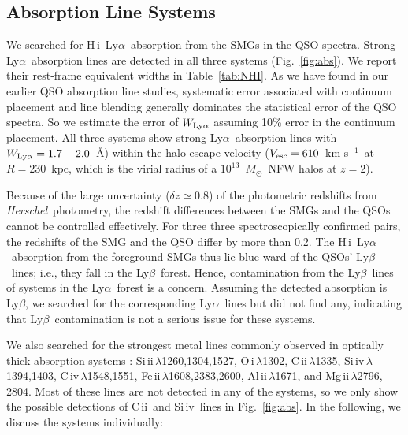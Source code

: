\documentclass[iop,revtex4,twocolumn,apj,numberedappendix,appendixfloats]{emulateapj}
\newcommand{\hers}{{\it Herschel}}
\newcommand{\kms}{{km s$^{-1}$}}
\newcommand{\msun}{$M_{\odot}$}
\newcommand{\lya}{Ly$\alpha$}
\newcommand{\lyb}{Ly$\beta$}
\newcommand{\HI}{H\,{\sc i}}
\newcommand{\CII}{C\,{\sc ii}}
\newcommand{\SiIV}{Si\,{\sc iv}}
\begin{document}
\subsection{Absorption Line Systems}

We searched for \HI\ \lya\ absorption from the SMGs in the QSO spectra. Strong \lya\ absorption lines are detected in all three systems (Fig.~\ref{fig:abs}). We report their rest-frame equivalent widths in Table~\ref{tab:NHI}. As we have found in our earlier QSO absorption line studies, systematic error associated with continuum placement and line blending generally dominates the statistical error of the QSO spectra. So we estimate the error of $W_{\rm Ly\alpha}$ assuming 10\% error in the continuum placement. All three systems show strong \lya\ absorption lines with $W_{\rm Ly\alpha} = 1.7-2.0$~\AA) within the halo escape velocity ($V_{\rm esc} = 610$~\kms\ at $R = 230$~kpc, which is the virial radius of a $10^{13}$~\msun\ NFW halos at $z = 2$).

Because of the large uncertainty ($\delta z \simeq 0.8$) of the photometric redshifts from \hers\ photometry, the redshift differences between the SMGs and the QSOs cannot be controlled effectively. For three three spectroscopically confirmed pairs, the redshifts of the SMG and the QSO differ by more than 0.2. The \HI\ \lya\ absorption from the foreground SMGs thus lie blue-ward of the QSOs' \lyb\ lines; i.e., they fall in the \lyb\ forest. Hence, contamination from the \lyb\ lines of systems in the \lya\ forest is a concern. Assuming the detected absorption is \lyb, we searched for the corresponding \lya\ lines but did not find any, indicating that \lyb\ contamination is not a serious issue for these systems. 

We also searched for the strongest metal lines commonly observed in optically thick absorption systems \citep[e.g.,][]{Hennawi13}: Si\,{\sc ii}\,$\lambda$1260,1304,1527, O\,{\sc i}\,$\lambda$1302, \CII\,$\lambda$1335, Si\,{\sc iv}\,$\lambda$1394,1403, C\,{\sc iv}\,$\lambda$1548,1551, Fe\,{\sc ii}\,$\lambda$1608,2383,2600, Al\,{\sc ii}\,$\lambda$1671, and Mg\,{\sc ii}\,$\lambda$2796, 2804. Most of these lines are not detected in any of the systems, so we only show the possible detections of \CII\ and \SiIV\ lines in Fig.~\ref{fig:abs}. In the following, we discuss the systems individually:
\end{document}
